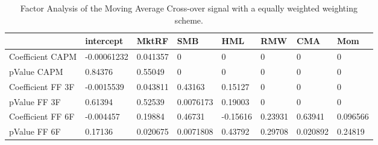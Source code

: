 \begin{table}[H]
\centering
\begin{tabular}{llllllll}
& intercept & MktRF & SMB & HML & RMW & CMA & Mom \\ 
\hline 
Coefficient CAPM & -0.00061232 & 0.041357 & 0 & 0 & 0 & 0 & 0 \\ 
pValue CAPM & 0.84376 & 0.55049 & 0 & 0 & 0 & 0 & 0 \\ 
Coefficient FF 3F & -0.0015539 & 0.043811 & 0.43163 & 0.15127 & 0 & 0 & 0 \\ 
pValue FF 3F & 0.61394 & 0.52539 & 0.0076173 & 0.19003 & 0 & 0 & 0 \\ 
Coefficient FF 6F & -0.004457 & 0.19884 & 0.46731 & -0.15616 & 0.23931 & 0.63941 & 0.096566 \\ 
pValue FF 6F & 0.17136 & 0.020675 & 0.0071808 & 0.43792 & 0.29708 & 0.020892 & 0.24819 \\ 
\hline
\end{tabular}
\caption{Factor Analysis of the Moving Average Cross-over signal with a equally weighted weighting scheme.}
\label{MAEW_FACTOR}
\end{table}